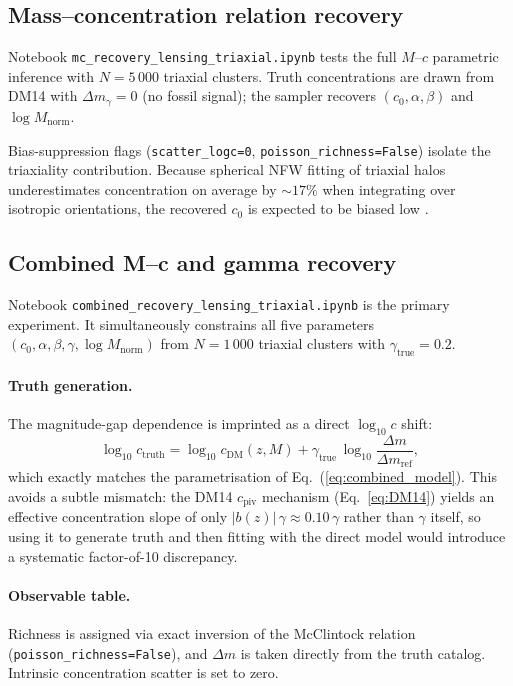 \documentclass[12pt,a4paper]{article}
\begin{document}
\subsection{Mass--concentration relation recovery}

Notebook \texttt{mc\_recovery\_lensing\_triaxial.ipynb} tests the full
$M$--$c$ parametric inference with $N=5\,000$ triaxial clusters.  Truth
concentrations are drawn from DM14 with $\Delta m_\gamma=0$ (no fossil signal);
the sampler recovers $(c_0, \alpha, \beta)$ and $\log M_\mathrm{norm}$.

Bias-suppression flags (\texttt{scatter\_logc=0}, \texttt{poisson\_richness=False})
isolate the triaxiality contribution.  Because spherical NFW fitting of triaxial
halos underestimates concentration on average by $\sim\!17\%$ when integrating over
isotropic orientations, the recovered $c_0$ is expected to be biased low
\citep{Clowe2004,Oguri2012}.

\subsection{Combined M--c and gamma recovery}

Notebook \texttt{combined\_recovery\_lensing\_triaxial.ipynb} is the primary
experiment.  It simultaneously constrains all five parameters
$(c_0, \alpha, \beta, \gamma, \log M_\mathrm{norm})$ from $N=1\,000$ triaxial clusters
with $\gamma_\mathrm{true}=0.2$.

\paragraph{Truth generation.}
The magnitude-gap dependence is imprinted as a direct $\log_{10}c$ shift:
\begin{equation}
  \log_{10}c_\mathrm{truth} = \log_{10}c_\mathrm{DM}(z, M)
    + \gamma_\mathrm{true}\,\log_{10}\!\frac{\Delta m}{\Delta m_\mathrm{ref}},
  \label{eq:truth_direct}
\end{equation}
which exactly matches the parametrisation of Eq.~(\ref{eq:combined_model}).  This
avoids a subtle mismatch: the DM14 $c_\mathrm{piv}$ mechanism (Eq.~\ref{eq:DM14})
yields an effective concentration slope of only $|b(z)|\,\gamma \approx 0.10\,\gamma$
rather than $\gamma$ itself, so using it to generate truth and then fitting with the
direct model would introduce a systematic factor-of-10 discrepancy.

\paragraph{Observable table.}
Richness is assigned via exact inversion of the McClintock relation
(\texttt{poisson\_richness=False}), and $\Delta m$ is taken directly from the truth
catalog.  Intrinsic concentration scatter is set to zero.
\end{document}
